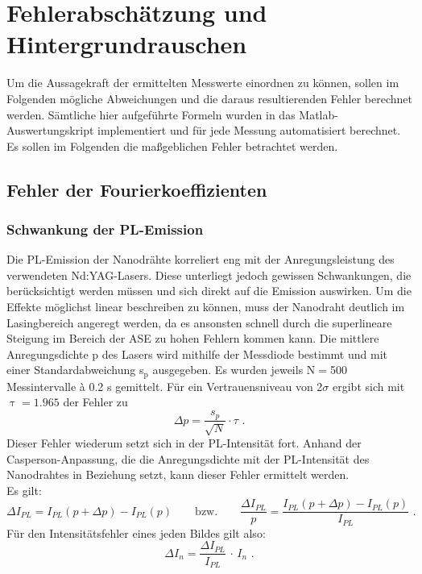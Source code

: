 \section{Fehlerabschätzung und Hintergrundrauschen}
\label{Fehler}
Um die Aussagekraft der ermittelten Messwerte einordnen zu können, sollen im Folgenden mögliche Abweichungen und die daraus resultierenden Fehler berechnet werden. Sämtliche hier aufgeführte Formeln wurden in das Matlab-Auswertungskript implementiert und für jede Messung automatisiert berechnet. Es sollen im Folgenden die maßgeblichen Fehler betrachtet werden.
\subsection{Fehler der Fourierkoeffizienten}
\subsubsection{Schwankung der PL-Emission}
Die PL-Emission der Nanodrähte korreliert eng mit der Anregungsleistung des verwendeten Nd:YAG-Lasers. Diese unterliegt jedoch gewissen Schwankungen, die berücksichtigt werden müssen und sich direkt auf die Emission auswirken. Um die Effekte möglichst linear beschreiben zu können, muss der Nanodraht deutlich im Lasingbereich angeregt werden, da es ansonsten schnell durch die superlineare Steigung im Bereich der ASE zu hohen Fehlern kommen kann. Die mittlere Anregungsdichte p des Lasers wird mithilfe der Messdiode bestimmt und mit einer Standardabweichung s$_\text{p}$ ausgegeben. Es wurden jeweils N$=$500 Messintervalle à 0.2 s gemittelt. Für ein Vertrauensniveau von 2$\sigma$ ergibt sich mit $\uptau=\text{1.965}$ der Fehler zu
\begin{equation}
\Delta p = \frac{s_p}{\sqrt{N}} \cdot \tau \text{ .}
\end{equation}
Dieser Fehler wiederum setzt sich in der PL-Intensität fort. Anhand der Casperson-Anpassung, die die Anregungsdichte mit der PL-Intensität des Nanodrahtes in Beziehung setzt, kann dieser Fehler ermittelt werden.\\
Es gilt:
\begin{equation}
\Delta I_{PL}= I_{PL}(p+ \Delta p)-I_{PL}(p) \qquad \text{bzw.} \qquad \frac{\Delta I_{PL}}{p}= \frac{I_{PL}(p + \Delta p)-I_{PL}(p)}{I_{PL}} \text{ .}
\end{equation}
Für den Intensitätsfehler eines jeden Bildes gilt also:
\begin{equation}
\Delta I_{n} = \frac{\Delta I_{PL}}{I_{PL}}\, \cdot \, I_{n} \text{ .}
\end{equation}
